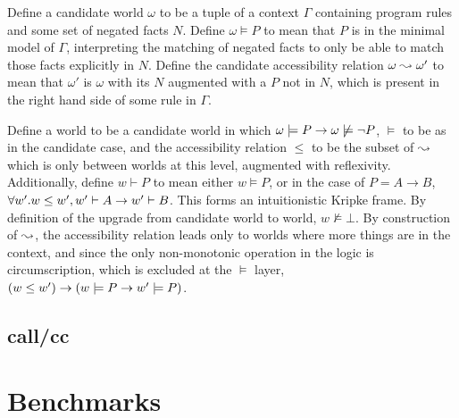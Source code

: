 Define a candidate world $\omega$ to be a tuple of a context $\Gamma$ containing program rules and some set of negated facts $N$.
Define $\omega \models P$ to mean that $P$ is in the minimal model of $\Gamma$, interpreting the matching of negated facts to only be able to match those facts explicitly in $N$.
Define the candidate accessibility relation $\omega \leadsto \omega'$ to mean that $\omega'$ is $\omega$ with its $N$ augmented with a $P$ not in $N$, which is present in the right hand side of some rule in $\Gamma$.

Define a world to be a candidate world in which $\omega \models P \rightarrow \omega \not \models \neg P$, $\models$ to be as in the candidate case, and the accessibility relation $\leq$ to be the subset of $\leadsto$ which is only between worlds at this level, augmented with reflexivity.
Additionally, define $w \vdash P$ to mean either $w \models P$, or in the case of $P = A \rightarrow B$, $\forall w'. w \leq w', w' \vdash A \rightarrow w' \vdash B$.
This forms an intuitionistic Kripke frame.
By definition of the upgrade from candidate world to world, $w \not \models \bot$.
By construction of $\leadsto$, the accessibility relation leads only to worlds where more things are in the context, and since the only non-monotonic operation in the logic is circumscription, which is excluded at the $\models$ layer, $(w \leq w') \rightarrow (w \models P \rightarrow w' \models P)$.

\subsection{call/cc}


\section{Benchmarks}
